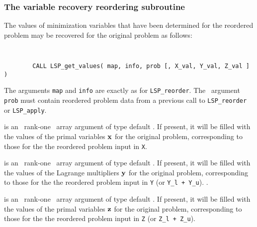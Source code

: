 \documentclass{galahad}
\newcommand{\packagename}{LSP}
\begin{document}

\subsubsection{The  variable recovery reordering subroutine}
The values of minimization variables that have been determined for the 
reordered problem may be recovered for the original problem as follows: 
\vspace*{-2mm}
{\tt 
\begin{verbatim}
        CALL LSP_get_values( map, info, prob [, X_val, Y_val, Z_val ] )
\end{verbatim}
}
\vspace*{-1mm}
\noindent
The arguments {\tt map} and {\tt info} are exactly as for 
{\tt \packagename\_reorder}. 
The \intentin\ argument {\tt prob}
must contain reordered problem data from a previous call 
to {\tt LSP\_reorder} or {\tt LSP\_apply}.

\begin{description}
 is an \optional\ rank-one \intentout\ array argument of 
type default \realdp. If 
present, it will be filled with the values of the primal variables ${\mathbf{x}}$ 
for the original problem, corresponding to those for the the reordered 
problem input in {\tt X}. 
 
 is an \optional\ rank-one \intentout\ array argument of 
type default \realdp. If present, 
it will be filled with the values of the Lagrange multipliers ${\mathbf{y}}$ 
for the original problem, corresponding to those for the the reordered 
problem input in {\tt Y} (or {\tt Y\_l + Y\_u}).
. 
 
 is an \optional\ rank-one \intentout\ array argument of 
type default \realdp. If 
present, it will be filled with the values of the primal variables ${\mathbf{z}}$ 
for the original problem, corresponding to those for the the reordered 
problem input in {\tt Z} (or {\tt Z\_l + Z\_u}).
\end{description}

\end{document}
